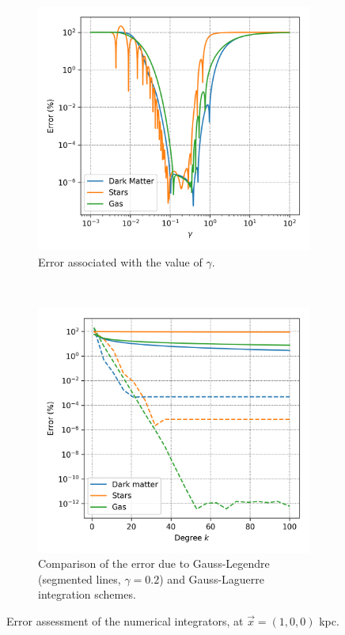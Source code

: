 		\begin{figure}[h]
			\centering
			\begin{subfigure}[t]{0.49\textwidth}
				\includegraphics[width = \textwidth]{"../Files/Week 8/gamma_error"}
				\caption{Error associated with the value of $\gamma$.}
				\label{fig: gammaError}
			\end{subfigure}
			~ 
			\begin{subfigure}[t]{0.49\textwidth}
				\includegraphics[width=\textwidth]{"../Files/Week 8/scheme_error"}
				\caption{Comparison of the error due to Gauss-Legendre (segmented lines, $\gamma = 0.2$) and Gauss-Laguerre integration schemes.}
				\label{fig: Gscheme_error}
			\end{subfigure}
			\caption{Error assessment of the numerical integrators, at $\vec{x} = (1, 0, 0)$ kpc.}
		\end{figure}
	
